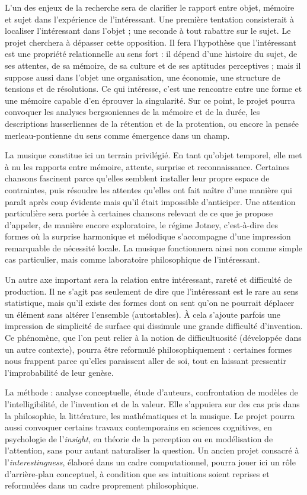 \documentclass[10pt,a4paper]{article}
\begin{document}
L'un des enjeux de la recherche sera de clarifier le rapport entre objet, mémoire
et sujet dans l'expérience de l'intéressant. Une première tentation consisterait
à localiser l'intéressant dans l'objet ; une seconde à tout rabattre sur le sujet.
Le projet cherchera à dépasser cette opposition. Il fera l'hypothèse que
l'intéressant est une propriété relationnelle au sens fort : il dépend d'une
histoire du sujet, de ses attentes, de sa mémoire, de sa culture et de ses
aptitudes perceptives ; mais il suppose aussi dans l'objet une organisation, une
économie, une structure de tensions et de résolutions. Ce qui intéresse, c'est
une rencontre entre une forme et une mémoire capable d'en éprouver la
singularité. Sur ce point, le projet pourra convoquer les analyses bergsoniennes
de la mémoire et de la durée, les descriptions husserliennes de la rétention et
de la protention, ou encore la pensée merleau-pontienne du sens comme émergence
dans un champ.

La musique constitue ici un terrain privilégié. En tant qu'objet temporel, elle
met à nu les rapports entre mémoire, attente, surprise et reconnaissance.
Certaines chansons fascinent parce qu'elles semblent installer leur propre
espace de contraintes, puis résoudre les attentes qu'elles ont fait naître d'une
manière qui paraît après coup évidente mais qu'il était impossible d'anticiper.
Une attention particulière sera portée à certaines chansons relevant de ce que
je propose d'appeler, de manière encore exploratoire, le régime Jotney,
c'est-à-dire des formes où la surprise harmonique et mélodique s'accompagne d'une
impression remarquable de nécessité locale. La musique fonctionnera ainsi non
comme simple cas particulier, mais comme laboratoire philosophique de
l'intéressant.

Un autre axe important sera la relation entre intéressant, rareté et difficulté
de production. Il ne s'agit pas seulement de dire que l'intéressant est le rare
au sens statistique, mais qu'il existe des formes dont on sent qu'on ne pourrait
déplacer un élément sans altérer l'ensemble (autostables). À cela s'ajoute parfois
une impression de simplicité de surface qui dissimule une grande difficulté
d'invention. Ce phénomène, que l'on peut relier à la notion de difficultuosité
(développée dans un autre contexte), pourra être reformulé philosophiquement :
certaines formes nous frappent parce qu'elles paraissent aller de soi, tout en
laissant pressentir l'improbabilité de leur genèse.

La méthode : analyse conceptuelle, étude d'auteurs, confrontation de modèles de
l'intelligibilité, de l'invention et de la valeur. Elle s'appuiera sur des cas
pris dans la philosophie, la littérature, les mathématiques et la musique. Le
projet pourra aussi convoquer certains travaux contemporains en sciences
cognitives, en psychologie de l'\emph{insight}, en théorie de la perception ou en
modélisation de l'attention, sans pour autant naturaliser la question. Un ancien
projet consacré à l'\emph{interestingness}, élaboré dans un cadre computationnel,
pourra jouer ici un rôle d'arrière-plan conceptuel, à condition que ses intuitions
soient reprises et reformulées dans un cadre proprement philosophique.
\end{document}
